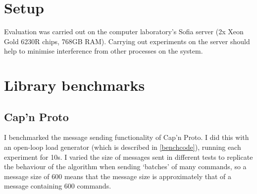 



\section{Setup}
Evaluation was carried out on the computer laboratory's Sofia server (2x Xeon Gold 6230R chips, 768GB RAM). Carrying out experiments on the server should help to minimise interference from other processes on the system.

\section{Library benchmarks}
\subsection{Cap'n Proto} \label{capnpbenchmark}
I benchmarked the message sending functionality of Cap'n Proto. I did this with an open-loop load generator (which is described in \ref{benchcode}), running each experiment for 10s. I varied the size of messages sent in different tests to replicate the behaviour of the algorithm when sending `batches' of many commands, so a message size of 600 means that the message size is approximately that of a message containing 600 commands.

